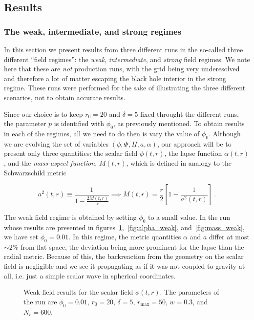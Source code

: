 \documentclass[a4paper,11pt]{article}
\renewcommand{\a}{\alpha}
\newcommand{\lrpar}[1]{\left( #1 \right)}
\newcommand{\lrsquare}[1]{\left[ #1 \right]}
\newcommand{\eq}[1]{
  \begin{equation}
    #1
  \end{equation}
}
\begin{document}
\subsection{Results}

\subsubsection{The weak, intermediate, and strong regimes}

In this section we present results from three different runs in the so-called three different ``field regimes'': the \emph{weak}, \emph{intermediate}, and \emph{strong} field regimes. We note here that these are \emph{not} production runs, with the grid being very underesolved and therefore a lot of matter escaping the black hole interior in the strong regime. These runs were performed for the sake of illustrating the three different scenarios, not to obtain accurate results.

Since our choice is to keep $r_{0}=20$ and $\delta=5$ fixed throught the different runs, the parameter $p$ is identified with $\phi_{0}$, as previously mentioned. To obtain results in each of the regimes, all we need to do then is vary the value of $\phi_{0}$. Although we are evolving the set of variables $\lrpar{\phi,\Phi,\Pi,a,\a}$, our approach will be to present only three quantities: the scalar field $\phi(t,r)$, the lapse function $\a(t,r)$, and the \emph{mass-aspect function}, $M(t,r)$, which is defined in analogy to the Schwarzschild metric

\eq{a^{2}(t,r) \equiv \frac{1}{1 - \frac{2M(t,r)}{r}} \implies M(t,r) = \frac{r}{2}\lrsquare{1 - \frac{1}{a^{2}(t,r)}}\ .}

The weak field regime is obtained by setting $\phi_{0}$ to a small value. In the run whose results are presented in figures~\ref{fig:phi_weak},~\ref{fig:alpha_weak}, and~\ref{fig:mass_weak}, we have set $\phi_{0}=0.01$. In this regime, the metric quantities $\a$ and $a$ differ at most $\sim2\%$ from flat space, the deviation being more prominent for the lapse than the radial metric. Because of this, the backreaction from the geometry on the scalar field is negligible and we see it propagating as if it was not coupled to gravity at all, i.e. just a simple scalar wave in spherical coordinates.

\begin{figure}[ht]
  \centering
  
  \caption[Weak field results for the scalar field $\phi(t,r)$.]{Weak field results for the scalar field $\phi(t,r)$. The parameters of the run are $\phi_{0}=0.01$, $r_{0}=20$, $\delta=5$, $r_{\max}=50$, $w=0.3$, and $N_{r}=600$.}
  \label{fig:phi_weak}
\end{figure}
\end{document}
